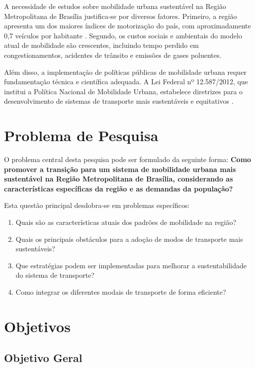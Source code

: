 A necessidade de estudos sobre mobilidade urbana sustentável na Região Metropolitana de Brasília justifica-se por diversos fatores. Primeiro, a região apresenta um dos maiores índices de motorização do país, com aproximadamente 0,7 veículos por habitante \cite{detran2023}. Segundo, os custos sociais e ambientais do modelo atual de mobilidade são crescentes, incluindo tempo perdido em congestionamentos, acidentes de trânsito e emissões de gases poluentes.

Além disso, a implementação de políticas públicas de mobilidade urbana requer fundamentação técnica e científica adequada. A Lei Federal nº 12.587/2012, que institui a Política Nacional de Mobilidade Urbana, estabelece diretrizes para o desenvolvimento de sistemas de transporte mais sustentáveis e equitativos \cite{brasil2012}.

\section{Problema de Pesquisa}

O problema central desta pesquisa pode ser formulado da seguinte forma: \textbf{Como promover a transição para um sistema de mobilidade urbana mais sustentável na Região Metropolitana de Brasília, considerando as características específicas da região e as demandas da população?}

Esta questão principal desdobra-se em problemas específicos:

\begin{enumerate}
    \item Quais são as características atuais dos padrões de mobilidade na região?
    \item Quais os principais obstáculos para a adoção de modos de transporte mais sustentáveis?
    \item Que estratégias podem ser implementadas para melhorar a sustentabilidade do sistema de transporte?
    \item Como integrar os diferentes modais de transporte de forma eficiente?
\end{enumerate}

\section{Objetivos}

\subsection{Objetivo Geral}

